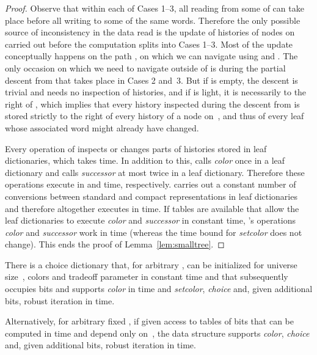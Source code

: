 \documentclass[envcountsame,envcountsect,undated,nolinenumbers]{lnthi}
\def\Tvn#1{\hbox{\textit{#1\/}}}
\begin{document}
\begin{proof}
Observe that within each of Cases 1--3, all reading
from some of  can take place before
all writing to some of the same words.
Therefore the only possible source of inconsistency
in the data read
is the update of histories of nodes on~
carried out before the computation
splits into Cases 1--3.
Most of the update conceptually happens on the
path , on which we can navigate using
 and .
The only occasion on which we need to navigate
outside of  is during the partial descent
from  that takes place in Cases 2 and~3.
But if  is empty, the descent is trivial
and needs no inspection of histories, and if
 is light, it is necessarily to the
right of , which implies that every history
inspected during the descent from  is stored
strictly to the right of every history of a
node on~, and thus of every leaf
whose associated word might already have changed.

\medskip

Every operation of  inspects or changes
 parts of histories stored in leaf
dictionaries, which takes  time.
In addition to this, 
calls \Tvn{color} once in a leaf dictionary
and  calls \Tvn{successor}
at most twice in a leaf dictionary.
Therefore these operations execute in 
and  time, respectively.
 carries out a constant number
of conversions between standard and
compact representations in
leaf dictionaries and therefore
altogether executes in  time.
If tables are available that allow the
leaf dictionaries to execute \Tvn{color}
and \Tvn{successor} in constant time,
's operations \Tvn{color} and \Tvn{successor}
work in  time (whereas the
time bound for \Tvn{setcolor} does not change).
This ends the proof of Lemma~\ref{lem:smalltree}.
\end{proof}

\begin{lemma}
\label{lem:unsystematic-tf}There is a choice dictionary that, for
arbitrary ,
can be initialized for universe size~,
 colors and tradeoff parameter 
in constant time and that subsequently occupies
 bits
and supports \Tvn{color} in  time and
\Tvn{setcolor},
\Tvn{choice} and, given  additional bits,
robust iteration in  time.

Alternatively, for arbitrary fixed ,
if given access to tables of
 bits that can be computed in
 time and
depend only on~, the data structure supports
\Tvn{color}, \Tvn{choice} and,
given  additional bits,
robust iteration
in  time.
\end{lemma}
\end{document}
